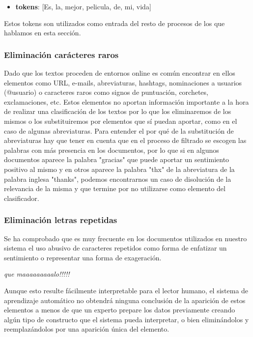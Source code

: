 \begin{itemize}
	\item \textbf{tokens}: [Es, la, mejor, pelicula, de, mi, vida]
\end{itemize}

Estos tokens son utilizados como entrada del resto de procesos de los que hablamos en esta sección.

\subsubsection{Eliminación carácteres raros}

Dado que los textos proceden de entornos online es común encontrar en ellos elementos como URL, e-mails, abreviaturas, hashtags, nominaciones a usuarios (@usuario) o caracteres raros como signos de puntuación, corchetes, exclamaciones, etc. Estos elementos no aportan información importante a la hora de realizar una clasificación de los textos por lo que los eliminaremos de los mismos o los substituiremos por elementos que sí puedan aportar, como en el caso de algunas abreviaturas. Para entender el por qué de la substitución de abreviaturas hay que tener en cuenta que en el proceso de filtrado se escogen las palabras con más presencia en los documentos, por lo que si en algunos documentos aparece la palabra "gracias" que puede aportar un sentimiento positivo al mismo y en otros aparece la palabra "thx" de la abreviatura de la palabra inglesa "thanks", podemos encontrarnos un caso de disolución de la relevancia de la misma y que termine por no utilizarse como elemento del clasificador. 

\subsubsection{Eliminación letras repetidas}

Se ha comprobado que es muy frecuente en los documentos utilizados en nuestro sistema el uso abusivo de caracteres repetidos como forma de enfatizar un sentimiento o representar una forma de exageración.

\textit{ que maaaaaaaaalo!!!!! } 

Aunque esto resulte fácilmente interpretable para el lector humano, el sistema de aprendizaje automático no obtendrá ninguna conclusión de la aparición de estos elementos a menos de que un experto prepare los datos previamente creando algún tipo de constructo que el sistema pueda interpretar, o bien eliminándolos y reemplazándolos por una aparición única del elemento.

